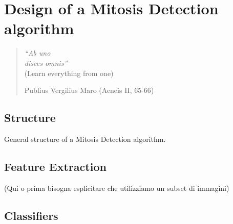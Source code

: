 \chapter{Design of a Mitosis Detection algorithm}
\label{chapter4}
\thispagestyle{empty}

\begin{quotation}
{\footnotesize
\noindent \emph{``Ab uno\\ disces omnis''}\\
\noindent (Learn everything from one)
\begin{flushright}
Publius Vergilius Maro (Aeneis II, 65-66)
\end{flushright}
}
\end{quotation}

\vspace{0.5cm}


\section{Structure}

General structure of a Mitosis Detection algorithm.

\vspace{0.5cm}

\section{Feature Extraction}

(Qui o prima bisogna esplicitare che utilizziamo un subset di immagini)

\section{Classifiers}

